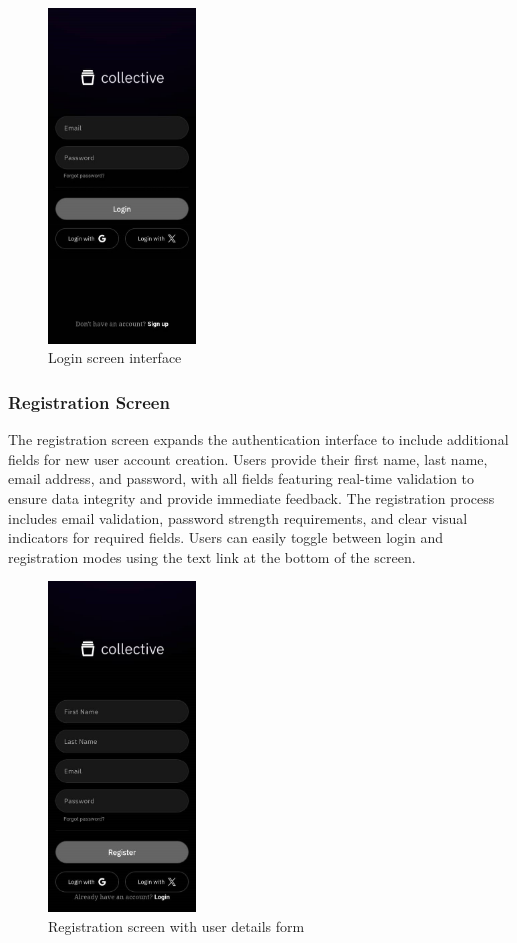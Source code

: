 \begin{figure}[H]
\centering
\includegraphics[width=0.35\textwidth]{files/imgs/prototype/auth_login.jpeg}
\caption{Login screen interface}
\label{fig:login-screen}
\end{figure}

\subsubsection{Registration Screen}

The registration screen expands the authentication interface to include additional fields for new user account creation. Users provide their first name, last name, email address, and password, with all fields featuring real-time validation to ensure data integrity and provide immediate feedback. The registration process includes email validation, password strength requirements, and clear visual indicators for required fields. Users can easily toggle between login and registration modes using the text link at the bottom of the screen.

\begin{figure}[H]
\centering
\includegraphics[width=0.35\textwidth]{files/imgs/prototype/auth_register.jpeg}
\caption{Registration screen with user details form}
\label{fig:registration-screen}
\end{figure}

